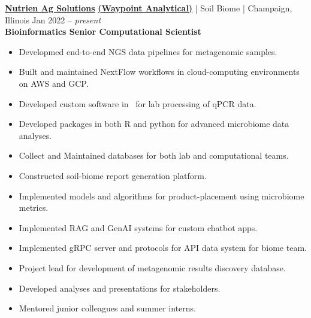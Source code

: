 
















\textbf{\href{https://nutrienagsolutions.com/}{{\color{black}Nutrien Ag Solutions}}} 
    \textbf{\href{https://waypointanalytical.com/}{{\color{black} (Waypoint Analytical)}}} | Soil Biome | Champaign, Illinois  \hfill Jan 2022 – \textit{present} \\
    \tab \textbf{Bioinformatics Senior Computational Scientist} \\
    \begin{addmargin}[1cm]{2cm}
    \begin{itemize}[left=-0.2cm, itemsep=-0.15cm]
        \item Developmed end-to-end NGS data pipelines for metagenomic samples.
        \item Built and maintained NextFlow workflows in cloud-computing environments on AWS and GCP.
        \item Developed custom software in \CC\ for lab processing of qPCR data.
        \item Developed packages in both R and python for advanced microbiome data analyses.
        \item Collect and Maintained databases for both lab and computational teams.
        \item Constructed soil-biome report generation platform.
        \item Implemented models and algorithms for product-placement using microbiome metrics.
        \item Implemented RAG and GenAI systems for custom chatbot apps.
        \item Implemented gRPC server and protocols for API data system for biome team.
        \item Project lead for development of metagenomic results discovery database.
        \item Developed analyses and presentations for stakeholders.
        \item Mentored junior colleagues and summer interns.
    \end{itemize}
    \end{addmargin} 

